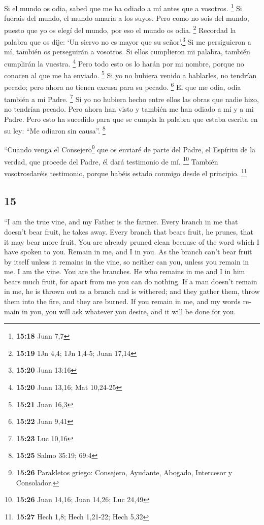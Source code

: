 \begin{paracol}{2}
 Si el mundo os odia, sabed que me ha odiado a mí antes
que a vosotros. \footnote{\textbf{15:18} Juan 7,7}  Si
fuerais del mundo, el mundo amaría a los suyos. Pero como no sois del
mundo, puesto que yo os elegí del mundo, por eso el mundo os odia.
\footnote{\textbf{15:19} 1Jn 4,4; 1Jn 1,4-5; Juan 17,14} 
Recordad la palabra que os dije: `Un siervo no es mayor que su
señor'.\footnote{\textbf{15:20} Juan 13:16} Si me persiguieron a mí,
también os perseguirán a vosotros. Si ellos cumplieron mi palabra,
también cumplirán la vuestra. \footnote{\textbf{15:20} Juan 13,16; Mat
  10,24-25}  Pero todo esto os lo harán por mi nombre,
porque no conocen al que me ha enviado. \footnote{\textbf{15:21} Juan
  16,3}  Si yo no hubiera venido a hablarles, no tendrían
pecado; pero ahora no tienen excusa para su pecado. \footnote{\textbf{15:22}
  Juan 9,41}  El que me odia, odia también a mi Padre.
\footnote{\textbf{15:23} Luc 10,16}  Si yo no hubiera
hecho entre ellos las obras que nadie hizo, no tendrían pecado. Pero
ahora han visto y también me han odiado a mí y a mi Padre.
 Pero esto ha sucedido para que se cumpla la palabra que
estaba escrita en su ley: ``Me odiaron sin causa''. \footnote{\textbf{15:25}
  Salmo 35:19; 69:4}

 ``Cuando venga el Consejero\footnote{\textbf{15:26}
  Parakletos griego: Consejero, Ayudante, Abogado, Intercesor y
  Consolador.} que os enviaré de parte del Padre, el Espíritu de la
verdad, que procede del Padre, él dará testimonio de mí. \footnote{\textbf{15:26}
  Juan 14,16; Juan 14,26; Luc 24,49}  También
vosotrosdaréis testimonio, porque habéis estado conmigo desde el
principio. \footnote{\textbf{15:27} Hech 1,8; Hech 1,21-22; Hech 5,32}

\switchcolumn
\begin{otherlanguage}{english}

\hypertarget{section-29}{%
\section{15}\label{section-29}}

 ``I am the true vine, and my Father is the farmer.
 Every branch in me that doesn't bear fruit, he takes
away. Every branch that bears fruit, he prunes, that it may bear more
fruit.  You are already pruned clean because of the word
which I have spoken to you.  Remain in me, and I in you.
As the branch can't bear fruit by itself unless it remains in the vine,
so neither can you, unless you remain in me.  I am the
vine. You are the branches. He who remains in me and I in him bears much
fruit, for apart from me you can do nothing.  If a man
doesn't remain in me, he is thrown out as a branch and is withered; and
they gather them, throw them into the fire, and they are burned.
 If you remain in me, and my words remain in you, you will
ask whatever you desire, and it will be done for you.


\end{otherlanguage}
\end{paracol}

